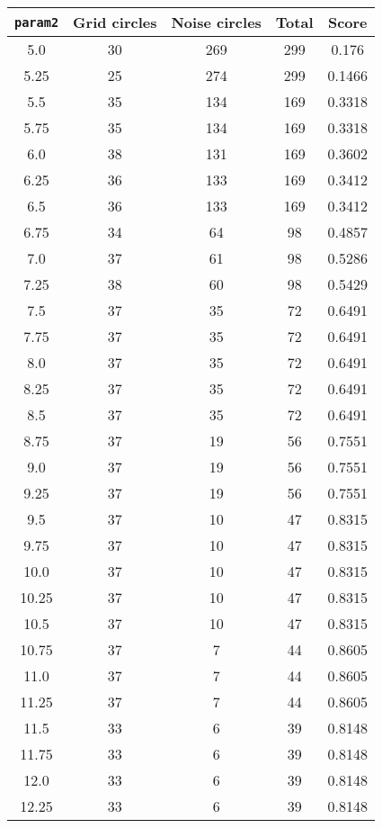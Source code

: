 \documentclass[letterpaper, 12pt]{article}
\begin{document}
\begin{longtable}{|c|c|c|c|c|}
\hline
\textbf{\texttt{param2}} & \textbf{Grid circles} & \textbf{Noise circles} & \textbf{Total} & \textbf{Score} \\
\hline
5.0 & 30 & 269 & 299 & 0.176 \\
\hline
5.25 & 25 & 274 & 299 & 0.1466 \\
\hline
5.5 & 35 & 134 & 169 & 0.3318 \\
\hline
5.75 & 35 & 134 & 169 & 0.3318 \\
\hline
6.0 & 38 & 131 & 169 & 0.3602 \\
\hline
6.25 & 36 & 133 & 169 & 0.3412 \\
\hline
6.5 & 36 & 133 & 169 & 0.3412 \\
\hline
6.75 & 34 & 64 & 98 & 0.4857 \\
\hline
7.0 & 37 & 61 & 98 & 0.5286 \\
\hline
7.25 & 38 & 60 & 98 & 0.5429 \\
\hline
7.5 & 37 & 35 & 72 & 0.6491 \\
\hline
7.75 & 37 & 35 & 72 & 0.6491 \\
\hline
8.0 & 37 & 35 & 72 & 0.6491 \\
\hline
8.25 & 37 & 35 & 72 & 0.6491 \\
\hline
8.5 & 37 & 35 & 72 & 0.6491 \\
\hline
8.75 & 37 & 19 & 56 & 0.7551 \\
\hline
9.0 & 37 & 19 & 56 & 0.7551 \\
\hline
9.25 & 37 & 19 & 56 & 0.7551 \\
\hline
9.5 & 37 & 10 & 47 & 0.8315 \\
\hline
9.75 & 37 & 10 & 47 & 0.8315 \\
\hline
10.0 & 37 & 10 & 47 & 0.8315 \\
\hline
10.25 & 37 & 10 & 47 & 0.8315 \\
\hline
10.5 & 37 & 10 & 47 & 0.8315 \\
\hline
10.75 & 37 & 7 & 44 & 0.8605 \\
\hline
11.0 & 37 & 7 & 44 & 0.8605 \\
\hline
11.25 & 37 & 7 & 44 & 0.8605 \\
\hline
11.5 & 33 & 6 & 39 & 0.8148 \\
\hline
11.75 & 33 & 6 & 39 & 0.8148 \\
\hline
12.0 & 33 & 6 & 39 & 0.8148 \\
\hline
12.25 & 33 & 6 & 39 & 0.8148 \\

\end{longtable}
\end{document}
